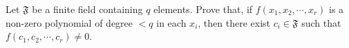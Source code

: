 Let $\mathfrak{F}$ be a finite field containing $q$ elements. Prove that, if $f(x_1, x_2, \cdots, x_r)$ is a non-zero polynomial of degree $< q$ in each $x_i$, then there exist $c_i \in \mathfrak{F}$ such that $f(c_1, c_2, \cdots, c_r) \neq 0$.